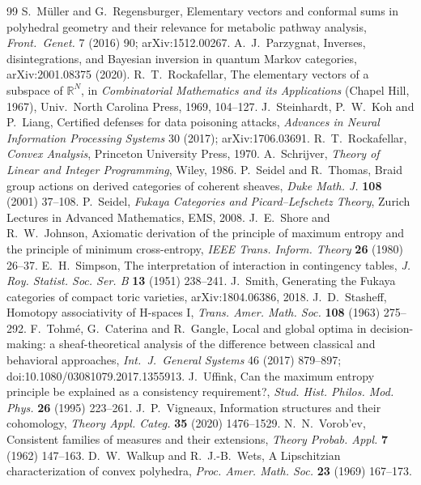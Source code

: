\documentclass[11pt]{article}
\theoremstyle{definition}\newtheorem{definition}[theorem]{Definition}\newtheorem{remark}[theorem]{Remark}\newtheorem{example}[theorem]{Example}\newtheorem{problem}[theorem]{Open problem}\crefname{problem}{Problem}{Problems}
\begin{document}
\begin{thebibliography}{99}
 S.~M\"uller and G.~Regensburger, Elementary vectors and conformal sums in polyhedral geometry and their relevance for metabolic pathway analysis, \emph{Front.\ Genet.} 7 (2016) 90; arXiv:1512.00267.
 A.~J.~Parzygnat, Inverses, disintegrations, and Bayesian inversion in quantum Markov categories, arXiv:2001.08375 (2020).
 R.~T.~Rockafellar, The elementary vectors of a subspace of $\mathbb R^N$, in \emph{Combinatorial Mathematics and its Applications} (Chapel Hill, 1967), Univ.\ North Carolina Press, 1969, 104--127.
 J.~Steinhardt, P.~W.~Koh and P.~Liang, Certified defenses for data poisoning attacks, \emph{Advances in Neural Information Processing Systems} 30 (2017); arXiv:1706.03691.
 R.~T.~Rockafellar, \emph{Convex Analysis}, Princeton University Press, 1970.
 A.~Schrijver, \emph{Theory of Linear and Integer Programming}, Wiley, 1986.
 P.~Seidel and R.~Thomas, Braid group actions on derived categories of coherent sheaves, \emph{Duke Math. J.} \textbf{108} (2001) 37--108.
 P.~Seidel, \emph{Fukaya Categories and Picard--Lefschetz Theory}, Zurich Lectures in Advanced Mathematics, EMS, 2008.
 J.~E.~Shore and R.~W.~Johnson, Axiomatic derivation of the principle of maximum entropy and the principle of minimum cross-entropy, \emph{IEEE Trans. Inform. Theory} \textbf{26} (1980) 26--37.
 E.~H.~Simpson, The interpretation of interaction in contingency tables, \emph{J. Roy. Statist. Soc. Ser. B} \textbf{13} (1951) 238--241.
 J.~Smith, Generating the Fukaya categories of compact toric varieties, arXiv:1804.06386, 2018.
 J.~D.~Stasheff, Homotopy associativity of H-spaces I, \emph{Trans. Amer. Math. Soc.} \textbf{108} (1963) 275--292.
 F.~Tohm\'e, G.~Caterina and R.~Gangle, Local and global optima in decision-making: a sheaf-theoretical analysis of the difference between classical and behavioral approaches, \emph{Int.\ J.\ General Systems} 46 (2017) 879--897; doi:10.1080/03081079.2017.1355913.
 J.~Uffink, Can the maximum entropy principle be explained as a consistency requirement?, \emph{Stud. Hist. Philos. Mod. Phys.} \textbf{26} (1995) 223--261.
 J.~P.~Vigneaux, Information structures and their cohomology, \emph{Theory Appl. Categ.} \textbf{35} (2020) 1476--1529.
 N.~N.~Vorob'ev, Consistent families of measures and their extensions, \emph{Theory Probab. Appl.} \textbf{7} (1962) 147--163.
 D.~W.~Walkup and R.~J.-B.~Wets, A Lipschitzian characterization of convex polyhedra, \emph{Proc. Amer. Math. Soc.} \textbf{23} (1969) 167--173.
\end{thebibliography}
\end{document}
